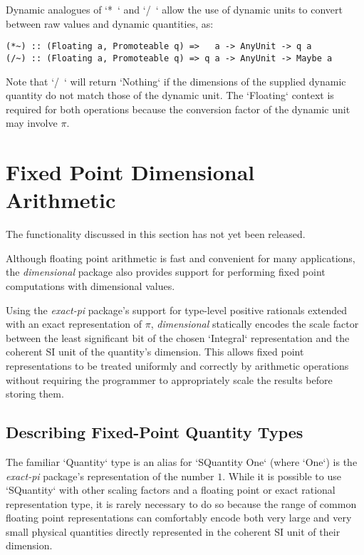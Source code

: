 \documentclass[11pt]{report}
\newcommand{\packagename}[1]{\textit{#1}}
\newcommand{\thispackage}{\packagename{dimensional}}
\newcommand{\prerelease}{\begin{framed}
The functionality discussed in this section has not yet been released.
\end{framed}}
\begin{document}
Dynamic analogues of `*~` and `/~` allow the use of dynamic units to convert between raw values and dynamic quantities, as:

\begin{lstlisting}
(*~) :: (Floating a, Promoteable q) =>   a -> AnyUnit -> q a
(/~) :: (Floating a, Promoteable q) => q a -> AnyUnit -> Maybe a
\end{lstlisting}

Note that `/~` will return `Nothing` if the dimensions of the supplied dynamic quantity do not match those of the
dynamic unit. The `Floating` context is required for both operations because the conversion factor of the
dynamic unit may involve $ \pi $.



\chapter{Fixed Point Dimensional Arithmetic}

\prerelease{}

Although floating point arithmetic is fast and convenient for many applications, the \thispackage{} package also provides
support for performing fixed point computations with dimensional values.

Using the \packagename{exact-pi} package's support for type-level positive rationals extended with an exact representation
of $ \pi $, \thispackage{} statically encodes the scale factor between the least significant bit of the chosen `Integral`
representation and the coherent SI unit of the quantity's dimension. This allows fixed point representations to be
treated uniformly and correctly by arithmetic operations without requiring the programmer to appropriately scale the results
before storing them.

\section{Describing Fixed-Point Quantity Types}

The familiar `Quantity` type is an alias for `SQuantity One` (where `One`) is the \packagename{exact-pi}
package's representation of the number $ 1 $. While it is possible to use `SQuantity` with other scaling factors and a
floating point or exact rational representation type, it is rarely necessary to do so because the range of common floating
point representations can comfortably encode both very large and very small physical quantities directly represented in the
coherent SI unit of their dimension.
\end{document}

